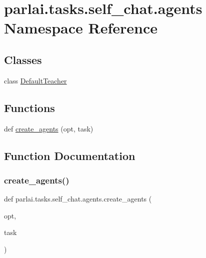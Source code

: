 \hypertarget{namespaceparlai_1_1tasks_1_1self__chat_1_1agents}{}\section{parlai.\+tasks.\+self\+\_\+chat.\+agents Namespace Reference}
\label{namespaceparlai_1_1tasks_1_1self__chat_1_1agents}
\subsection*{Classes}
\begin{DoxyCompactItemize}
\item 
class \hyperlink{classparlai_1_1tasks_1_1self__chat_1_1agents_1_1DefaultTeacher}{Default\+Teacher}
\end{DoxyCompactItemize}
\subsection*{Functions}
\begin{DoxyCompactItemize}
\item 
def \hyperlink{namespaceparlai_1_1tasks_1_1self__chat_1_1agents_a02cc779445cb6c7c9271fd9d193af167}{create\+\_\+agents} (opt, task)
\end{DoxyCompactItemize}


\subsection{Function Documentation}
\mbox{\label{namespaceparlai_1_1tasks_1_1self__chat_1_1agents_a02cc779445cb6c7c9271fd9d193af167}} 
\subsubsection{\texorpdfstring{create\+\_\+agents()}{create\_agents()}}
{\footnotesize\ttfamily def parlai.\+tasks.\+self\+\_\+chat.\+agents.\+create\+\_\+agents (\begin{DoxyParamCaption}\item[{}]{opt,  }\item[{}]{task }\end{DoxyParamCaption})}



